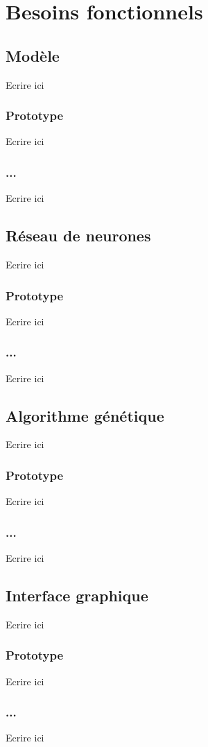 \chapter{Besoins fonctionnels}

\section{Modèle}
Ecrire ici
\subsection{Prototype}
Ecrire ici
\subsection{...}
Ecrire ici


\section{Réseau de neurones}
Ecrire ici
\subsection{Prototype}
Ecrire ici
\subsection{...}
Ecrire ici

\section{Algorithme génétique}
Ecrire ici
\subsection{Prototype}
Ecrire ici
\subsection{...}
Ecrire ici

\section{Interface graphique}
Ecrire ici
\subsection{Prototype}
Ecrire ici
\subsection{...}
Ecrire ici



\clearpage
